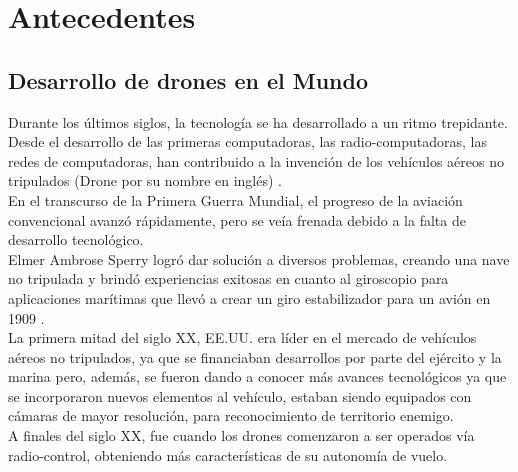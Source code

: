 %

\section{Antecedentes}

%
\subsection{Desarrollo de drones en el Mundo}
Durante los últimos siglos, la tecnología se ha desarrollado a un ritmo 
trepidante. Desde el desarrollo de las primeras computadoras, las 
radio-computadoras, las redes de computadoras, han contribuido a la invención de 
los vehículos aéreos no tripulados (Drone por su nombre en inglés) 
\cite{vehiculos_aereos_lat}. \\
En el transcurso de la Primera Guerra Mundial, el progreso de la aviación 
convencional avanzó rápidamente, pero se veía frenada debido a la falta de 
desarrollo tecnológico. \\
Elmer Ambrose Sperry logró dar solución a diversos problemas, creando una nave 
no tripulada y brindó experiencias exitosas en cuanto al giroscopio para 
aplicaciones marítimas que llevó a crear un giro estabilizador para un avión en 
1909 \cite{origen_drones, elmer_sperry}. \\
La primera mitad del siglo XX, EE.UU. era líder en el mercado de vehículos 
aéreos no tripulados, ya que se financiaban desarrollos por parte del ejército y 
la marina pero, además, se fueron dando a conocer más avances tecnológicos ya 
que se incorporaron nuevos elementos al vehículo, estaban siendo equipados con 
cámaras de mayor resolución, para reconocimiento de territorio enemigo. \\
A finales del siglo XX, fue cuando los drones comenzaron a ser operados vía 
radio-control, obteniendo más características de su autonomía de vuelo. \\

%
